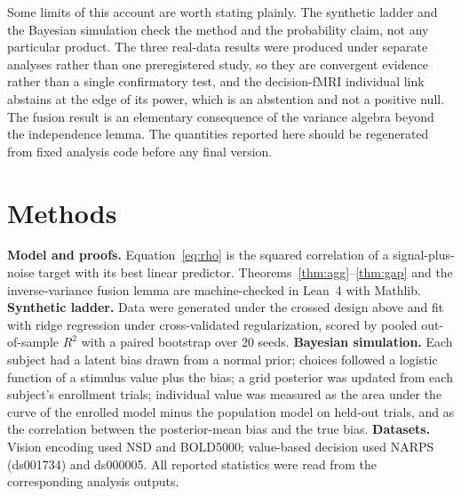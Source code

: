 \documentclass[11pt]{article}
\begin{document}
Some limits of this account are worth stating plainly. The synthetic ladder and the Bayesian simulation check
the method and the probability claim, not any particular product. The three real-data results were produced
under separate analyses rather than one preregistered study, so they are convergent evidence rather than a single
confirmatory test, and the decision-fMRI individual link abstains at the edge of its power, which is an abstention
and not a positive null. The fusion result is an elementary consequence of the variance algebra beyond the
independence lemma. The quantities reported here should be regenerated from fixed analysis code before any final
version.

\section*{Methods}
\textbf{Model and proofs.} Equation~\ref{eq:rho} is the squared correlation of a signal-plus-noise target with
its best linear predictor. Theorems~\ref{thm:agg}--\ref{thm:gap} and the inverse-variance fusion lemma are
machine-checked in Lean~4 with Mathlib. \textbf{Synthetic ladder.} Data were generated under the crossed design
above and fit with ridge regression under cross-validated regularization, scored by pooled out-of-sample $R^2$
with a paired bootstrap over 20 seeds. \textbf{Bayesian simulation.} Each subject had a latent bias drawn from a
normal prior; choices followed a logistic function of a stimulus value plus the bias; a grid posterior was updated
from each subject's enrollment trials; individual value was measured as the area under the curve of the enrolled
model minus the population model on held-out trials, and as the correlation between the posterior-mean bias and the
true bias. \textbf{Datasets.} Vision encoding used NSD and BOLD5000; value-based decision used NARPS (ds001734) and
ds000005. All reported statistics were read from the corresponding analysis outputs.
\end{document}
